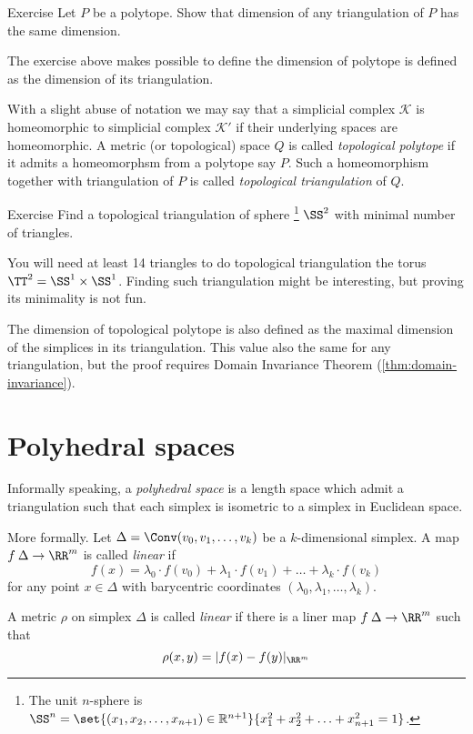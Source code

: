 \begin{thm}{Exercise}
Let $P$ be a polytope.
Show that dimension of any triangulation of $P$ has the same dimension.
\end{thm}

The exercise above makes possible to define
the dimension of polytope is defined 
as the dimension of its triangulation.

With a slight abuse of notation we may say that a simplicial complex $\mathcal{K}$ is homeomorphic to simplicial complex $\mathcal{K}'$
if their underlying spaces are homeomorphic.
A metric (or topological) space $Q$ is called \emph{topological polytope} if it admits a homeomorphsm from a polytope say $P$.
Such a homeomorphism together with triangulation of $P$
is called \emph{topological triangulation} of $Q$.  

\begin{thm}{Exercise}
Find a topological triangulation of sphere%
\footnote{The unit $n$-sphere is $\SS^n = \set{(x_1, x_2, \ldots, x_{n+1}) \in \mathbb{R}^{n+1}}{x_1^2 + x_2^2 + \ldots + x_{n+1}^2 = 1} $.} $\SS^2$ with minimal number of triangles.
\end{thm}

You will need at least 14 triangles 
to do topological triangulation the torus $\TT^2=\SS^1\times\SS^1$.
Finding such triangulation might be interesting, but proving its minimality is not fun.

The dimension of topological polytope is
 also defined as the maximal dimension of the 
simplices in its triangulation.
This value also the same for any triangulation,
but the proof requires Domain Invariance Theorem (\ref{thm:domain-invariance}).

\section*{Polyhedral spaces}

Informally speaking, a \emph{polyhedral space} is a length space which admit a triangulation such that each simplex is isometric to a simplex in Euclidean space.

More formally.
Let $\Delta=\Conv(v_0,v_1,\dots,v_k)$ be a $k$-dimensional simplex. 
A map $f\:\Delta\to\RR^m$ is called \emph{linear} if
$$f(x)
=
\lambda_0\cdot f(v_0)+\lambda_1\cdot f(v_1)+\dots+\lambda_k\cdot f(v_k)$$
for any point $x\in \Delta$ with barycentric coordinates $(\lambda_0,\lambda_1,\dots,\lambda_k)$.

A metric $\rho$ on simplex $\Delta$ is called \emph{linear} 
if there is a liner map $f\:\Delta\to\RR^m$ such that
$$\rho(x,y)=|f(x)-f(y)|_{\RR^m}$$

